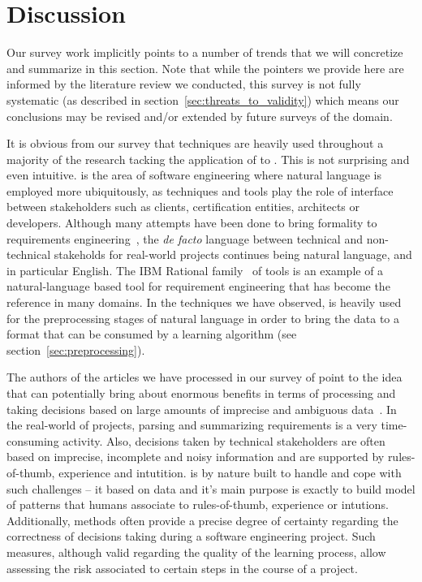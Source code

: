 \section{Discussion}
\label{sec:discussion}

Our survey work implicitly points to a number of trends that we will
concretize and summarize in this section. Note that while the pointers we
provide here are informed by the literature review we conducted, this survey is
not fully systematic (as described in section~\ref{sec:threats_to_validity}) which
means our conclusions may be revised and/or extended by future surveys of the
domain.

It is obvious from our survey that \NLP techniques are heavily used
throughout a majority of the research tacking the application of \ML to
\RE. This is not surprising and even intuitive. \RE is the area of software
engineering where natural language is employed more ubiquitously, as \RE
techniques and tools play the role of interface between stakeholders such as
clients, certification entities, architects or developers. Although many
attempts have been done to bring formality to requirements
engineering~\cite{Teufl17,LucioRCA16}, the \emph{de facto} language between
technical and non-technical stakeholds for real-world projects continues being natural language, and in particular English.
The IBM Rational \DOORS family~\cite{doors} of tools is an example
of a natural-language based tool for requirement engineering that has become the
reference in many domains. In the techniques we have observed, \NLP is heavily
used for the preprocessing stages of natural language in order to bring the data to a format
that can be consumed by a learning algorithm (see
section~\ref{sec:preprocessing}).
 
The authors of the articles we have processed in our survey of point
to the idea that \ML can potentially bring about enormous benefits in terms of
processing and taking decisions based on  large amounts of imprecise and
ambiguous data~\cite{some citations here}. In the real-world of projects,
parsing and summarizing requirements is a very time-consuming activity. Also,
decisions taken by technical stakeholders are often based on imprecise,
incomplete and noisy information and are supported by rules-of-thumb, experience
and intutition. \ML is by nature built to handle and cope with such challenges
-- it based on data and it's main purpose is exactly to build model of patterns
that humans associate to rules-of-thumb, experience or intutions. Additionally,
\ML methods often provide a precise degree of certainty regarding the
correctness of decisions taking during a software engineering project. Such
measures, although valid regarding the quality of the learning process, allow
assessing the risk associated to certain steps in the course of a project.

